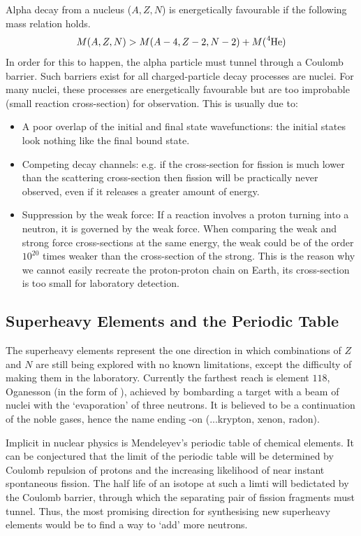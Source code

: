 Alpha decay from a nucleus (\(A, Z, N\)) is energetically favourable if the following mass relation holds.
\[M(A, Z, N) > M(A-4, Z-2, N-2) + M(\ce{^4He})\]
In order for this to happen, the alpha particle must tunnel through a Coulomb barrier. Such barriers exist for all charged-particle decay processes are nuclei. For many nuclei, these processes are energetically favourable but are too improbable (small reaction cross-section) for observation. This is usually due to:
\begin{itemize}
    \item A poor overlap of the initial and final state wavefunctions: the initial states look nothing like the final bound state.
    \item Competing decay channels: e.g. if the cross-section for fission is much lower than the scattering cross-section then fission will be practically never observed, even if it releases a greater amount of energy.
    \item Suppression by the weak force: If a reaction involves a proton turning into a neutron, it is governed by the weak force. When comparing the weak and strong force cross-sections at the same energy, the weak could be of the order \(10^{20}\) times weaker than the cross-section of the strong. This is the reason why we cannot easily recreate the proton-proton chain on Earth, its cross-section is too small for laboratory detection.
\end{itemize}



\subsection{Superheavy Elements and the Periodic Table}
The superheavy elements represent the one direction in which combinations of \(Z\) and \(N\) are still being explored with no known limitations, except the difficulty of making them in the laboratory. Currently the farthest reach is element \(118\), Oganesson (in the form of ), achieved by bombarding a  target with a beam of  nuclei with the `evaporation' of three neutrons. It is believed to be a continuation of the noble gases, hence the name ending -on (...krypton, xenon, radon).

Implicit in nuclear physics is Mendeleyev's periodic table of chemical elements. It can be conjectured that the limit of the periodic table will be determined by Coulomb repulsion of protons and the increasing likelihood of near instant spontaneous fission. The half life of an isotope at such a limti will bedictated by the Coulomb barrier, through which the separating pair of fission fragments must tunnel. Thus, the most promising direction for synthesising new superheavy elements would be to find a way to `add' more neutrons. 


